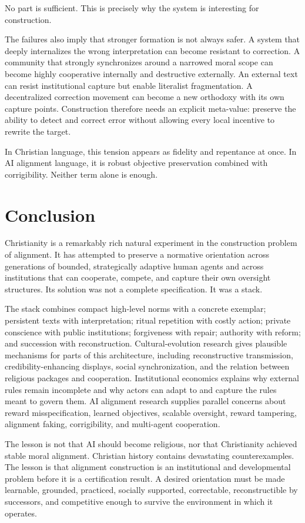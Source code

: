 \documentclass[11pt]{article}
\begin{document}
No part is sufficient. This is precisely why the system is interesting for construction.

The failures also imply that stronger formation is not always safer. A system that deeply internalizes the wrong interpretation can become resistant to correction. A community that strongly synchronizes around a narrowed moral scope can become highly cooperative internally and destructive externally. An external text can resist institutional capture but enable literalist fragmentation. A decentralized correction movement can become a new orthodoxy with its own capture points. Construction therefore needs an explicit meta-value: preserve the ability to detect and correct error without allowing every local incentive to rewrite the target.

In Christian language, this tension appears as fidelity and repentance at once. In AI alignment language, it is robust objective preservation combined with corrigibility. Neither term alone is enough.

\section{Conclusion}

Christianity is a remarkably rich natural experiment in the construction problem of alignment. It has attempted to preserve a normative orientation across generations of bounded, strategically adaptive human agents and across institutions that can cooperate, compete, and capture their own oversight structures. Its solution was not a complete specification. It was a stack.

The stack combines compact high-level norms with a concrete exemplar; persistent texts with interpretation; ritual repetition with costly action; private conscience with public institutions; forgiveness with repair; authority with reform; and succession with reconstruction. Cultural-evolution research gives plausible mechanisms for parts of this architecture, including reconstructive transmission, credibility-enhancing displays, social synchronization, and the relation between religious packages and cooperation. Institutional economics explains why external rules remain incomplete and why actors can adapt to and capture the rules meant to govern them. AI alignment research supplies parallel concerns about reward misspecification, learned objectives, scalable oversight, reward tampering, alignment faking, corrigibility, and multi-agent cooperation.

The lesson is not that AI should become religious, nor that Christianity achieved stable moral alignment. Christian history contains devastating counterexamples. The lesson is that alignment construction is an institutional and developmental problem before it is a certification result. A desired orientation must be made learnable, grounded, practiced, socially supported, correctable, reconstructible by successors, and competitive enough to survive the environment in which it operates.
\end{document}
